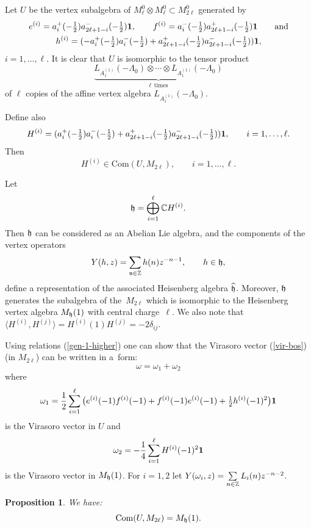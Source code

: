 \documentclass[11pt]{article}
\newtheorem{proposition}{Proposition}
\newcommand{\n}{\frak n}
\newcommand{\Z}{\Bbb Z}
\newcommand{\C}{\Bbb C}
\newcommand{\1}{\bf 1}
\begin{document}
Let $U$ be the vertex subalgebra  of $M_{\ell} ^0 \otimes M_{\ell}
^0 \subset M_{2 \ell} ^0$ generated by
\begin{gather}
e^{(i)}=a_i ^+ (-\tfrac{1}{2}) a_{
2\ell +1-i} ^-( -\tfrac{1}{2}) {\1}, \qquad  f^{(i)}=a_ i ^-
(-\tfrac{1}{2}) a_{2\ell +1-i} ^+(
-\tfrac{1}{2}) {\1} \qquad \mbox{and} \nonumber \\
 h^{(i)}= (-a_ i ^+ (-\tfrac{1}{2}) a_i^-( -\tfrac{1}{2}) +
a_{2\ell +1-i} ^+ (-\tfrac{1}{2}) a_{2\ell +1-i} ^-( -\tfrac{1}{2})){\1}, \label{gen-1-higher}
 \end{gather}
$i =1, \dots, \ell$. It is clear that $U$ is isomorphic to the tensor product
\[
 \underbrace{ L_{A_1 ^{(1)}}( -\Lambda _{0}) \otimes \cdots \otimes  L_{A_1 ^{(1)}}( -\Lambda _{0})}_{\ell \ \  \mbox{times} }
\]
of $\ell$ copies of the af\/f\/ine vertex algebra $ L_{A_1 ^{(1)}}(-\Lambda _{0})$.

Def\/ine also
 \[
 H ^{(i)} =   (a_i ^+ (-\tfrac{1}{2}) a_i ^- (-\tfrac{1}{2})+a_{2\ell +1-i} ^+ (-\tfrac{1}{2})
 a_{2\ell +1-i} ^- (-\tfrac{1}{2}) ) {\1}, \qquad i=1, \dots,
 \ell.
 \]
 Then
 \[ H ^{(i)} \in \mbox{Com} ( U, M_{2\ell}), \qquad i=1, \dots,  \ell.
 \]

 Let \[ {\frak h}= \bigoplus_{i =1 } ^{ \ell} {\C} H ^{(i)}.\] Then ${\frak h}$ can be
 considered as an Abelian Lie algebra, and the components of the vertex operators
 \[
 Y(h,z) = \sum_{\n \in {\Z} } h(n) z ^{-n-1}, \qquad h \in {\frak  h},
 \]
 def\/ine a representation of the associated Heisenberg algebra $\widehat{\frak h}$.
 Moreover, ${\frak h}$ generates the subalgebra of the~$M_{2 \ell}$ which is isomorphic to the
 Heisenberg vertex algebra $M_{\frak h} (1)$ with central charge~$\ell$.
 We also note that $\langle H ^{(i)}, H ^{(j)} \rangle = H ^{(i)}(1)H ^{(j)}= -2 \delta _{ij}$.


Using relations (\ref{gen-1-higher}) one can show that the Virasoro
vector (\ref{vir-bos}) (in $M_{2 \ell}$) can be written in a~form:
\[ \omega =  \omega_1   + \omega_2 \]
where \[\omega_1 =\frac{1}{2} \sum_{i = 1 } ^{\ell} \big(e
^{(i)}(-1)f^{(i)}(-1)+f ^{(i)} (-1)e^{(i)}(-1)+ \tfrac{1}{2} h ^{(i)}
(-1)^2\big){\1}
\] is the  Virasoro vector  in $U$  and
\[\omega_2 = -\frac{1}{4}\sum_{i = 1 } ^{\ell} H ^{(i) }(-1) ^{2}
{\1}\] is the Virasoro vector   in $M_{\frak h} (1)$.
For $i=1,2$ let
$Y(\omega_i , z) = \sum\limits_{n\in {\Z} } L_i (n) z ^{-n-2}$.

\begin{proposition} \label{com-bos-higher}
We have:
\[
{\rm Com} (U, M_{2\ell}) = M_{\frak h} (1).
\]
\end{proposition}
\end{document}
